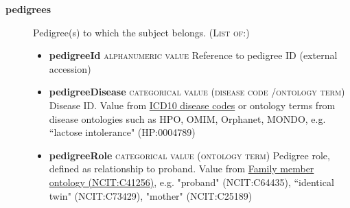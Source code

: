 \documentclass[a4paper, 10pt]{article}        %
\begin{document}
\begin{description}
	\item[\textbf{pedigrees}] Pedigree(s) to which the subject belongs. {\textsc{(List of:)}}
	\begin{itemize}
			\item[] \textbf{pedigreeId} {\textsc{alphanumeric value}} Reference to pedigree ID (external accession) 
			\item[] \textbf{pedigreeDisease} {\textsc{categorical value (disease code /ontology term)}} Disease ID. Value from \href{https://www.who.int/classifications/icd/en/}{ICD10 disease codes} or ontology terms from disease ontologies such as HPO, OMIM, Orphanet, MONDO, e.g. ``lactose intolerance" (HP:0004789)
			\item[] \textbf{pedigreeRole} {\textsc{categorical value (ontology term)}} Pedigree role, defined as relationship to proband. Value from \href{https://www.ebi.ac.uk/ols/ontologies/ncit/terms?iri=http%3A%2F%2Fpurl.obolibrary.org%2Fobo%2FNCIT_C41256}{Family member ontology (NCIT:C41256)}, e.g. "proband" (NCIT:C64435), ``identical twin" (NCIT:C73429), "mother" (NCIT:C25189)
			


\end{itemize}
\end{description}
\end{document}
